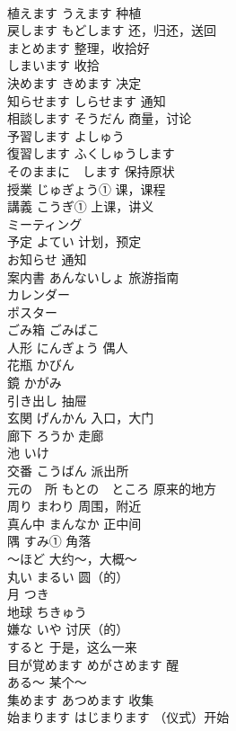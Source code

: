 \documentclass[8pt]{extreport}
\begin{document}
\begin{CJK}{UTF8}{min}
\\	植えます	うえます 种植	
\\	戻します	もどします 还，归还，送回	
\\	まとめます	整理，收拾好	
\\	しまいます	收拾	
\\	決めます	きめます 决定	
\\	知らせます	しらせます 通知	
\\	相談します	そうだん 商量，讨论	
\\	予習します	よしゅう	
\\	復習します	ふくしゅうします	
\\	そのままに　します	保持原状	
\\	授業	じゅぎょう① 课，课程	
\\	講義	こうぎ① 上课，讲义	
\\	ミーティング	
\\	予定	よてい 计划，预定	
\\	お知らせ	通知	
\\	案内書	あんないしょ 旅游指南	
\\	カレンダー	
\\	ポスター	
\\	ごみ箱	ごみばこ	
\\	人形	にんぎょう 偶人	
\\	花瓶	かびん	
\\	鏡	かがみ	
\\	引き出し	抽屉	
\\	玄関	げんかん 入口，大门	
\\	廊下	ろうか 走廊	
\\	池	いけ	
\\	交番	こうばん 派出所	
\\	元の　所	もとの　ところ 原来的地方	
\\	周り	まわり 周围，附近	
\\	真ん中	まんなか 正中间	
\\	隅	すみ① 角落	
\\	〜ほど	大约～，大概～	
\\	丸い	まるい 圆（的）	
\\	月	つき	
\\	地球	ちきゅう	
\\	嫌な	いや 讨厌（的）	
\\	すると	于是，这么一来	
\\	目が覚めます	めがさめます 醒	
\\	ある〜	某个～	
\\	集めます	あつめます 收集	
\\	始まります	はじまります （仪式）开始	

\end{CJK}
\end{document}
